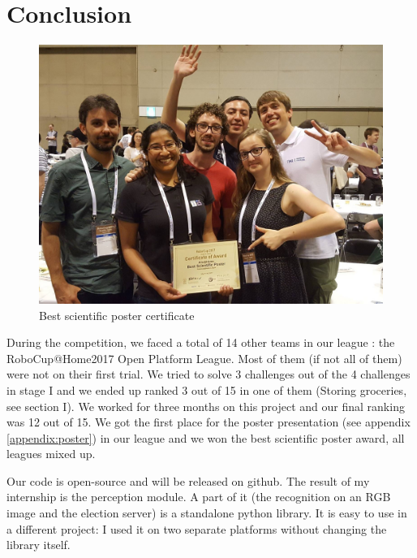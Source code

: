 \documentclass[a4paper, twocolumn]{article}
\begin{document}
    \section*{Conclusion}

    \begin{figure}
        \includegraphics[width=\columnwidth]{../img/certificate.jpg}
        \caption{Best scientific poster certificate}
        \label{certificate}
    \end{figure}

    During the competition, we faced a total of 14 other teams in our league : the RoboCup@Home2017 Open Platform League. Most of them (if not all of them) were not on their first trial. We tried to solve 3 challenges out of the 4 challenges in stage I and we ended up ranked 3 out of 15 in one of them (Storing groceries, see section I). We worked for three months on this project and our final ranking was 12 out of 15. We got the first place for the poster presentation (see appendix \ref{appendix:poster}) in our league and we won the best scientific poster award, all leagues mixed up.

    Our code is open-source and will be released on github. The result of my internship is the perception module. A part of it (the recognition on an RGB image and the election server) is a standalone python library. It is easy to use in a different project: I used it on two separate platforms without changing the library itself.
\end{document}
